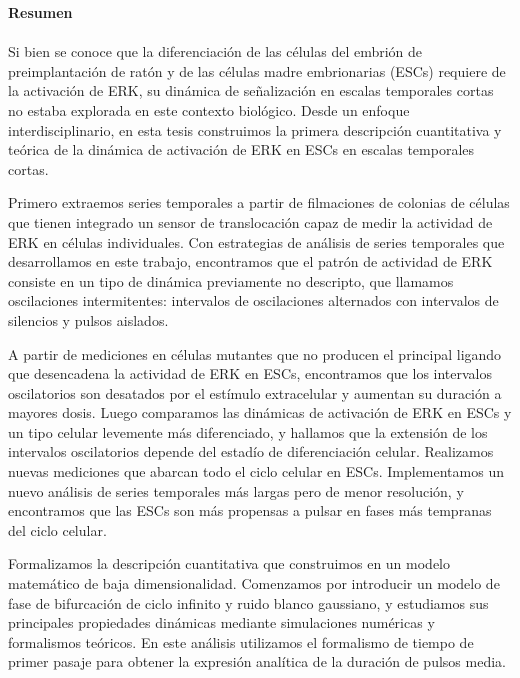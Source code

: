\documentclass[./main.tex]{subfiles}
\begin{document}

{\noindent\large\textbf{Resumen}} \\ \\ 
Si bien se conoce que la diferenciación de las células del embrión de preimplantación de ratón y de las células madre embrionarias (ESCs) requiere de la activación de ERK, su dinámica de señalización en escalas temporales cortas no estaba explorada en este contexto biológico. Desde un enfoque interdisciplinario, en esta tesis construimos la primera descripción cuantitativa y teórica de la dinámica de activación de ERK en ESCs en escalas temporales cortas. 

Primero extraemos series temporales a partir de filmaciones de colonias de células que tienen integrado un sensor de translocación capaz de medir la actividad de ERK en células individuales. Con estrategias de análisis de series temporales que desarrollamos en este trabajo, encontramos que el patrón de actividad de ERK consiste en un tipo de dinámica previamente no descripto, que llamamos oscilaciones intermitentes: intervalos de oscilaciones alternados con intervalos de silencios y pulsos aislados. 

A partir de mediciones en células mutantes que no producen el principal ligando que desencadena la actividad de ERK en ESCs, encontramos que los intervalos oscilatorios son desatados por el estímulo extracelular y aumentan su duración a mayores dosis. Luego comparamos las dinámicas de activación de ERK en ESCs y un tipo celular levemente más diferenciado, y hallamos que la extensión de los intervalos oscilatorios depende del estadío de diferenciación celular. Realizamos nuevas mediciones que abarcan todo el ciclo celular en ESCs. Implementamos un nuevo análisis de series temporales más largas pero de menor resolución, y encontramos que las ESCs son más propensas a pulsar en fases más tempranas del ciclo celular.


Formalizamos la descripción cuantitativa que construimos en un modelo matemático de baja dimensionalidad. Comenzamos por introducir un modelo de fase de bifurcación de ciclo infinito y ruido blanco gaussiano, y estudiamos sus principales propiedades dinámicas mediante simulaciones numéricas y formalismos teóricos. En este análisis utilizamos el formalismo de tiempo de primer pasaje para obtener la expresión analítica de la duración de pulsos media. 
\end{document}
